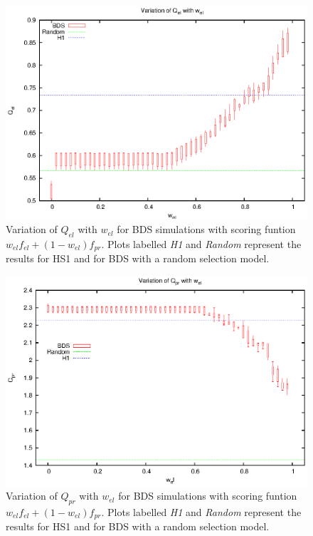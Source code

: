 \begin{figure}[htbp]
  \begin{center}
    \includegraphics[scale=1.0, angle=0]{figures/cmp_el.eps}
  \end{center}
  \caption[Variation of $Q_{el}$ with $w_{el}$ for BDS simulations.]
  {Variation of $Q_{el}$ with $w_{el}$ for BDS simulations with scoring funtion $w_{el}f_{el}+(1-w_{el})f_{pr}$. Plots labelled \emph{H1} and \emph{Random} represent the results for HS1 and for BDS with a random selection model.}
  \label{fig:bdsqel}
\end{figure}
  
\begin{figure}[htbp]
  \begin{center}
    \includegraphics[scale=1.0, angle=0]{figures/cmp_pr.eps}
  \end{center}
  \caption[Variation of $Q_{pr}$ with $w_{el}$ for BDS simulations.]
  {Variation of $Q_{pr}$ with $w_{el}$ for BDS simulations with scoring funtion $w_{el}f_{el}+(1-w_{el})f_{pr}$. Plots labelled \emph{H1} and \emph{Random} represent the results for HS1 and for BDS with a random selection model.}
  \label{fig:bdsqpr}
\end{figure}
 
